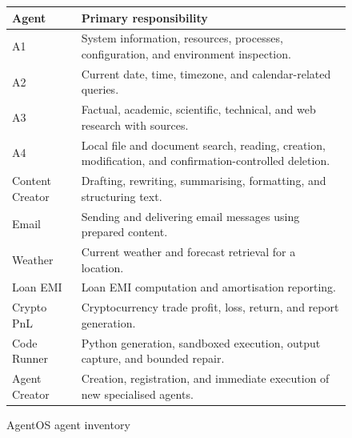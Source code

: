 \begin{figure}[H]
\centering
\begin{tabularx}{\textwidth}{|>{\raggedright\arraybackslash}p{}|>{\raggedright\arraybackslash}X|}
\hline
Agent & Primary responsibility \\ \hline
A1 & System information, resources, processes, configuration, and environment inspection. \\ \hline
A2 & Current date, time, timezone, and calendar-related queries. \\ \hline
A3 & Factual, academic, scientific, technical, and web research with sources. \\ \hline
A4 & Local file and document search, reading, creation, modification, and confirmation-controlled deletion. \\ \hline
Content Creator & Drafting, rewriting, summarising, formatting, and structuring text. \\ \hline
Email & Sending and delivering email messages using prepared content. \\ \hline
Weather & Current weather and forecast retrieval for a location. \\ \hline
Loan EMI & Loan EMI computation and amortisation reporting. \\ \hline
Crypto PnL & Cryptocurrency trade profit, loss, return, and report generation. \\ \hline
Code Runner & Python generation, sandboxed execution, output capture, and bounded repair. \\ \hline
Agent Creator & Creation, registration, and immediate execution of new specialised agents. \\ \hline
\end{tabularx}
\caption{AgentOS agent inventory}
\label{tab:agent-inventory}
\end{figure}

